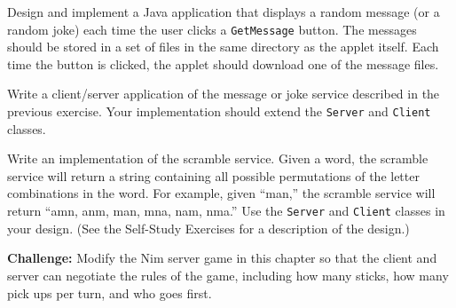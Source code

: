 \begin{EXRtwo}
\item  Design and implement a Java application that displays
a random message (or a random joke) each time the user clicks a
{\tt GetMessage} button.  The messages should be stored in a set of files in
the same directory as the applet itself.  Each time the button is
clicked, the applet should download one of the message files.

\item  Write a client/server application of the message or
joke service described in the previous exercise.  Your implementation
should extend the {\tt Server} and {\tt Client} classes.

\item  Write an implementation of the scramble service.  Given a word,
the scramble service will return a string containing all possible
permutations of the letter combinations in the word.  For example, given ``man,''
the scramble service will return ``amn, anm, man, mna, nam, nma.''
Use the {\tt Server} and {\tt Client} classes in your design.  (See the
Self-Study Exercises for a description of the design.)

\item  {\bf Challenge:} Modify the Nim server game in this chapter so that
the client and server can negotiate the rules of the game, including
how many sticks, how many pick ups per turn, and who goes first.

\end{EXRtwo}
%
